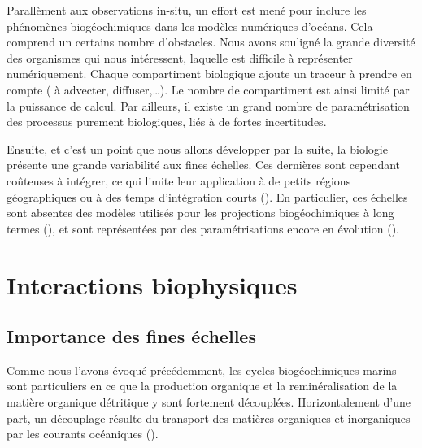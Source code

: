 Parallèment aux observations in-situ, un effort est mené pour inclure les phénomènes biogéochimiques dans les modèles numériques d'océans.
Cela comprend un certains nombre d'obstacles.
Nous avons souligné la grande diversité des organismes qui nous intéressent, laquelle est difficile à représenter numériquement.
Chaque compartiment biologique ajoute un traceur à prendre en compte ( à advecter, diffuser,\dots). Le nombre de compartiment est ainsi limité par la puissance de calcul.
Par ailleurs, il existe un grand nombre de paramétrisation des processus purement biologiques, liés à de fortes incertitudes.

Ensuite, et c'est un point que nous allons développer par la suite, la biologie présente une grande variabilité aux fines échelles.
Ces dernières sont cependant coûteuses à intégrer, ce qui limite leur application à de petits régions géographiques ou à des temps d'intégration courts (\cite{kessouri_2020,hewitt_2022}).
En particulier, ces échelles sont absentes des modèles utilisés pour les projections biogéochimiques à long termes (\cite{bopp_2013}), et sont représentées par des paramétrisations encore en évolution (\cite{fox-kemper_2019}).



\section{Interactions biophysiques}
\label{sec:interactions-biophys}

\subsection{Importance des fines échelles}

Comme nous l'avons évoqué précédemment, les cycles biogéochimiques marins sont particuliers en ce que la production organique et la reminéralisation de la matière organique détritique y sont fortement découplées.
Horizontalement d'une part, un découplage résulte du transport des matières organiques et inorganiques par les courants océaniques (\cite{chabert_2021}).

